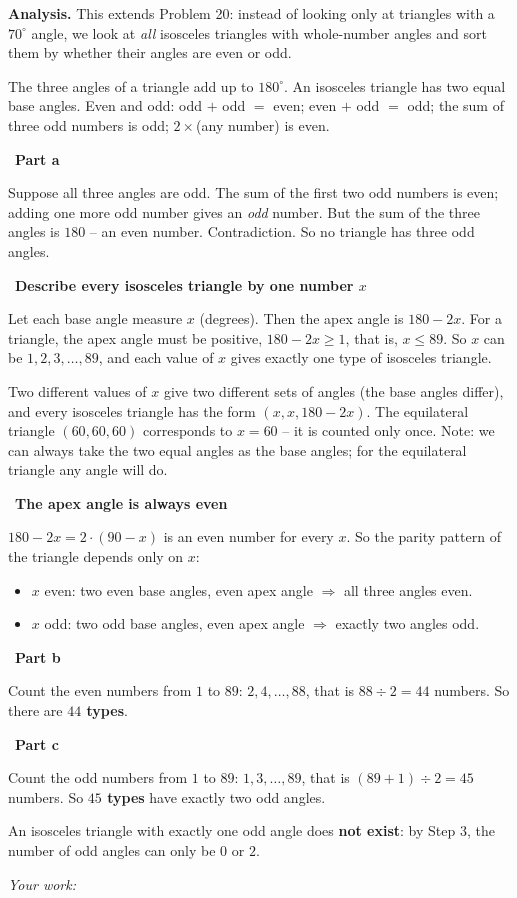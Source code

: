 \documentclass[11pt]{article}
\newif\ifsol \solfalse
\newcommand{\StuProb}[2]{\begin{probboxS}{#1}{#2}\StuProbBody\end{probboxS}}
\newcommand{\probsol}[1]{%
  \begin{lrbox}{\solmeasure}\begin{minipage}{\dimexpr\linewidth-24pt\relax}#1\end{minipage}\end{lrbox}%
  \ifsol
    \begin{solbox}#1\end{solbox}%
  \else
    \setlength{\solht}{\dimexpr\ht\solmeasure+\dp\solmeasure+0.85cm\relax}%
    \ifdim\solht<1.35cm\setlength{\solht}{1.35cm}\fi
    \ifdim\solht>\StudentMaxWork\setlength{\solht}{\StudentMaxWork}\fi
    \par\noindent\begin{minipage}{\linewidth}%
    \expandafter\StuProb\StuProbArgs
    \begin{tcolorbox}[colback=white,colframe=Line,boxrule=0.8pt,arc=5pt,
      left=8pt,right=8pt,top=4pt,bottom=4pt,height=\solht]{\footnotesize\color{Slate}\itshape\WorkWord}\end{tcolorbox}%
    \end{minipage}\par\medskip
  \fi}
\newlength{\StudentMaxWork}\setlength{\StudentMaxWork}{4.5cm}
\newcommand{\step}[2]{\par\smallskip\noindent{\bfseries\color{tmBlue!85!black}\StepWord~#1.}\ {\bfseries #2}\par\nopagebreak}
\def\WorkWord{Your work:}
\def\StepWord{Step}
\begin{document}
\probsol{
\textbf{Analysis.} This extends Problem 20: instead of looking only at triangles with a $70^\circ$ angle, we look at \emph{all} isosceles triangles with whole-number angles and sort them by whether their angles are even or odd.
\begin{recallbox}The three angles of a triangle add up to $180^\circ$. An isosceles triangle has two equal base angles. Even and odd: odd $+$ odd $=$ even; even $+$ odd $=$ odd; the sum of three odd numbers is odd; $2\times$(any number) is even.\end{recallbox}

\step{1}{Part a}
Suppose all three angles are odd. The sum of the first two odd numbers is even; adding one more odd number gives an \emph{odd} number. But the sum of the three angles is $180$ -- an even number. Contradiction. So no triangle has three odd angles.

\step{2}{Describe every isosceles triangle by one number $x$}
Let each base angle measure $x$ (degrees). Then the apex angle is $180-2x$. For a triangle, the apex angle must be positive, $180-2x\ge 1$, that is, $x\le 89$. So $x$ can be $1,2,3,\dots,89$, and each value of $x$ gives exactly one type of isosceles triangle.
\begin{proofbox}Two different values of $x$ give two different sets of angles (the base angles differ), and every isosceles triangle has the form $(x,x,180-2x)$. The equilateral triangle $(60,60,60)$ corresponds to $x=60$ -- it is counted only once. Note: we can always take the two equal angles as the base angles; for the equilateral triangle any angle will do.\end{proofbox}

\step{3}{The apex angle is always even}
$180-2x=2\cdot(90-x)$ is an even number for every $x$. So the parity pattern of the triangle depends only on $x$:
\begin{itemize}[leftmargin=1.3em,itemsep=1pt]
\item $x$ even: two even base angles, even apex angle $\Rightarrow$ all three angles even.
\item $x$ odd: two odd base angles, even apex angle $\Rightarrow$ exactly two angles odd.
\end{itemize}

\step{4}{Part b}
Count the even numbers from $1$ to $89$: $2,4,\dots,88$, that is $88\div 2=44$ numbers. So there are \textbf{$44$ types}.

\step{5}{Part c}
Count the odd numbers from $1$ to $89$: $1,3,\dots,89$, that is $(89+1)\div 2=45$ numbers. So \textbf{$45$ types} have exactly two odd angles.\par
An isosceles triangle with exactly one odd angle does \textbf{not exist}: by Step 3, the number of odd angles can only be $0$ or $2$.

}
\end{document}
